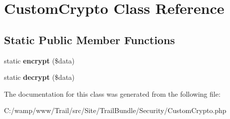 \hypertarget{class_site_1_1_trail_bundle_1_1_security_1_1_custom_crypto}{}\section{Custom\+Crypto Class Reference}
\label{class_site_1_1_trail_bundle_1_1_security_1_1_custom_crypto}
\subsection*{Static Public Member Functions}
\begin{DoxyCompactItemize}
\item 
\hypertarget{class_site_1_1_trail_bundle_1_1_security_1_1_custom_crypto_ade41ab520119e8c8dadcc11a0130592e}{}static {\bfseries encrypt} (\$data)\label{class_site_1_1_trail_bundle_1_1_security_1_1_custom_crypto_ade41ab520119e8c8dadcc11a0130592e}

\item 
\hypertarget{class_site_1_1_trail_bundle_1_1_security_1_1_custom_crypto_adcbcf18fb6132d50468d91ef5eece88a}{}static {\bfseries decrypt} (\$data)\label{class_site_1_1_trail_bundle_1_1_security_1_1_custom_crypto_adcbcf18fb6132d50468d91ef5eece88a}

\end{DoxyCompactItemize}


The documentation for this class was generated from the following file\+:\begin{DoxyCompactItemize}
\item 
C\+:/wamp/www/\+Trail/src/\+Site/\+Trail\+Bundle/\+Security/Custom\+Crypto.\+php\end{DoxyCompactItemize}
